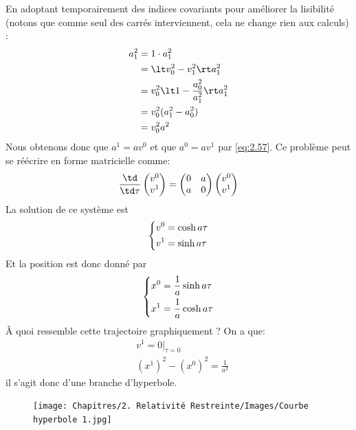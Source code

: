 {En adoptant temporairement des indices covariants pour améliorer la lisibilité (notons que comme seul des carrés interviennent, cela ne change rien aux calculs) :
\begin{align}
    a_1^2 &= 1 \cdot a_1^2\\
    &= \lt v_0^2 - v_{1}^2 \rt a_{1}^2\\
    &= v_{0}^2 \lt 1 - \frac{a_0^2}{a_1^2} \rt a_1^2\\
    &= v_{0}^2(a_{1}^2 - a_{0}^2)\\
    &= v_{0}^2 a^2
\end{align}
Nous obtenons donc que $a^1 = av^{0}$ et que $a^0 = av^{1}$ par \ref{eq:2.57}. Ce problème peut se réécrire en forme matricielle comme:
\begin{equation}
\frac{\td }{\td \tau} \begin{pmatrix}
    v^0 \\
    v^1
\end{pmatrix} = \begin{pmatrix}
    0 & a \\
    a & 0
\end{pmatrix}
\begin{pmatrix}
    v^0 \\
    v^1
\end{pmatrix}
\end{equation} 
La solution de ce système est
\begin{align} 
    \begin{dcases}
        v^{0} = \cosh{a\tau}\\
        v^{1} = \sinh{a\tau}
    \end{dcases}
\end{align}
Et la position est donc donné par
\begin{align} 
\label{eq:Rindler}
    \begin{dcases}
        x^{0} = \frac{1}{a}\sinh{a\tau}\\
        x^{1} = \frac{1}{a}\cosh{a\tau}
    \end{dcases}
\end{align}
À quoi ressemble cette trajectoire graphiquement ? On a que:
\begin{align}
    &v^{1} = 0|_{\tau = 0}\\
    &(x^1)^2 - (x^0)^2 = \frac{1}{a^2}
\end{align}
il s'agit donc d'une branche d'hyperbole.
\begin{figure}[H]
    \centering
    \texttt{[image: Chapitres/2. Relativité Restreinte/Images/Courbe hyperbole 1.jpg]}
    \caption{}
    \label{fig:2.8}
\end{figure}

}
